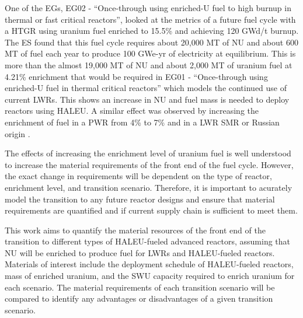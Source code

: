 One of the \glspl{EG}, \gls{EG}02 - ``Once-through using enriched-U fuel to 
high burnup in thermal or fast critical reactors'', looked at the metrics 
of a future fuel cycle with a \gls{HTGR} using uranium fuel enriched to 
15.5\% and achieving 120 GWd/t burnup. The \gls{ES} found that this fuel cycle
requires about 20,000 MT of \gls{NU} and about 600 MT of fuel each year 
to produce 100 GWe-yr of electricity at equilibrium. This is more than the 
almost 19,000 MT of \gls{NU} and about 2,000 MT of uranium fuel at 4.21\%
enrichment that would be required in \gls{EG}01 - ``Once-through using enriched-U 
fuel in thermal critical reactors'' which models the continued use of current 
\glspl{LWR}. This shows an increase in \gls{NU} and fuel mass is needed to 
deploy reactors using \gls{HALEU}.
A similar effect was observed by increasing the enrichment of fuel in a 
\gls{PWR} from 4\% to 7\% \cite{burns_reactor_2020} and in a \gls{LWR}
\gls{SMR} or Russian origin \cite{hernandez_potential_2020}. 

The effects of increasing the enrichment level of uranium fuel is well 
understood to increase the material requirements of the front end of 
the fuel cycle. However, the exact change in requirements will be dependent 
on the type of reactor, enrichment level, and transition scenario.
Therefore, it is important to acurately model the transition to any future
reactor designs and ensure that material requirements are quantified and
if current supply chain is sufficient to meet them. 

This work aims to quantify the material resources of the front end of the 
transition to different types of \gls{HALEU}-fueled advanced reactors, 
assuming that \gls{NU} will be enriched to produce fuel for \glspl{LWR} and 
\gls{HALEU}-fueled reactors. 
Materials of interest include the deployment schedule of \gls{HALEU}-fueled 
reactors, mass of enriched uranium, and the \gls{SWU} capacity required to 
enrich uranium for each scenario. The material requirements of each transition 
scenario will be compared to identify any advantages or disadvantages of 
a given transition scenario. 